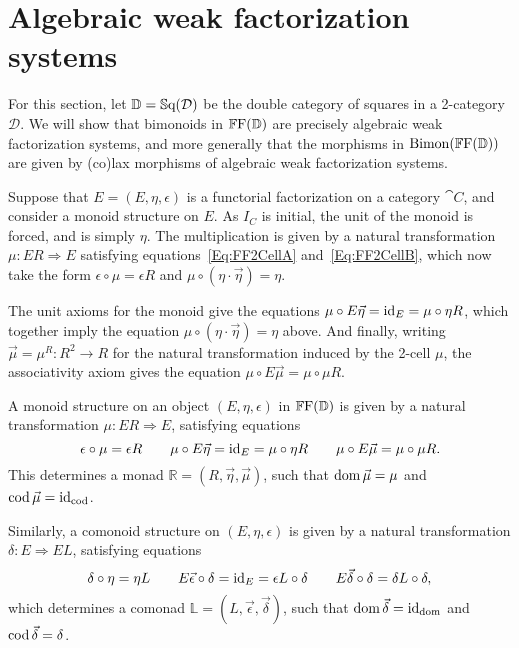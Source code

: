 
\chapter{Algebraic weak factorization systems}\label{Ch:Awfs}

For this section, let $\mathbb{D}=\mathbb{S}\mathrm{q}(\mathcal{D})$ be the double category of squares in a 2-category $\mathcal{D}$. We will show that bimonoids in $\mathbb{F}\mathrm{F}(\mathbb{D})$ are precisely algebraic weak factorization systems, and more generally that the morphisms in $\mathrm{Bimon}(\mathbb{F}\mathrm{F}(\mathbb{D}))$ are given by (co)lax morphisms of algebraic weak factorization systems.

Suppose that $E=(E,\eta,\epsilon)$ is a functorial factorization on a category $\cat{C}$, and consider a monoid structure on $E$. As $I_C$ is initial, the unit of the monoid is forced, and is simply $\eta$. The multiplication is given by a natural transformation $\mu\colon ER\Rightarrow E$ satisfying equations~\eqref{Eq:FF2CellA} and~\eqref{Eq:FF2CellB}, which now take the form $\epsilon\circ\mu = \epsilon R$ and $\mu\circ(\eta\cdot\vec{\eta})=\eta$.

The unit axioms for the monoid give the equations $\mu\circ E\vec{\eta}=\operatorname{id}_E=\mu\circ\eta R$, which together imply the equation $\mu\circ(\eta\cdot\vec{\eta})=\eta$ above. And finally, writing $\vec{\mu}=\mu^R\colon R^2\to R$ for the natural transformation induced by the 2-cell $\mu$, the associativity axiom gives the equation $\mu\circ E\vec{\mu}=\mu\circ\mu R$.

\begin{proposition}
	A monoid structure on an object $(E,\eta,\epsilon)$ in $\mathbb{F}\mathrm{F}(\mathbb{D})$ is given by a natural transformation $\mu\colon ER\Rightarrow E$, satisfying equations
	\begin{equation}
		\epsilon\circ\mu=\epsilon R \qquad 
			\mu\circ E\vec{\eta}=\operatorname{id}_E=\mu\circ\eta R \qquad 
			\mu\circ E\vec{\mu}=\mu\circ\mu R.
	\end{equation}
	This determines a monad $\mathbb{R}=(R,\vec{\eta},\vec{\mu})$, such that $\operatorname{dom}\vec{\mu}=\mu$ and $\operatorname{cod}\vec{\mu}=\operatorname{id}_{\operatorname{cod}}$.

	Similarly, a comonoid structure on $(E,\eta,\epsilon)$ is given by a natural transformation $\delta\colon E\Rightarrow EL$, satisfying equations
	\begin{equation}
		\delta\circ\eta=\eta L \qquad 
			E\vec{\epsilon}\circ\delta=\operatorname{id}_E=\epsilon L\circ\delta \qquad
			E\vec{\delta}\circ\delta=\delta L\circ\delta,
	\end{equation}
	which determines a comonad $\mathbb{L}=(L,\vec{\epsilon},\vec{\delta})$, such that $\operatorname{dom}\vec{\delta}=\operatorname{id}_{\operatorname{dom}}$ and $\operatorname{cod}\vec{\delta}=\delta$.
\end{proposition}

